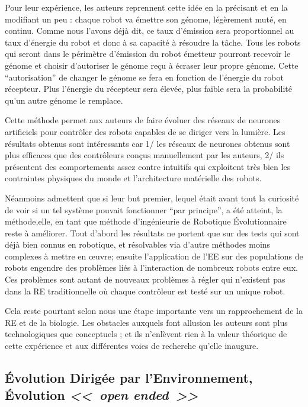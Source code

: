 Pour leur expérience, les auteurs reprennent cette idée en la précisant et en la modifiant un peu : chaque robot va émettre son génome, légèrement muté, en continu. Comme nous l'avons déjà dit,  ce taux d'émission sera proportionnel au taux d'énergie du robot et donc à sa capacité à résoudre la tâche. Tous les robots qui seront dans le périmètre d'émission du robot émetteur pourront recevoir le génome et choisir d'autoriser le génome reçu à écraser leur propre génome. Cette ``autorisation'' de changer le génome se fera en fonction de l'énergie du robot récepteur. Plus l'énergie du récepteur sera élevée, plus faible sera la probabilité qu'un autre génome le remplace.

Cette méthode permet aux auteurs de faire évoluer des réseaux de neurones artificiels pour contrôler des robots capables de se diriger vers la lumière. Les résultats obtenus sont intéressants car 1/ les réseaux de neurones obtenus sont plus efficaces que des contrôleurs conçus manuellement par les auteurs, 2/ ils présentent des comportements assez contre intuitifs qui exploitent très bien les contraintes physiques du monde et l'architecture matérielle des robots.

Néanmoins \cite{watson02embodiedevolutiondistributingevolutionaryalgorithmpopulationrobots} admettent que si leur but premier, lequel était avant tout la curiosité de voir si un tel système pouvait fonctionner ``par principe'', a été atteint, la méthode,elle, en tant que méthode d'ingénieurie de Robotique \'Evolutionnaire reste à améliorer. Tout d'abord les résultats ne portent que sur des tests qui sont déjà bien connus en robotique, et résolvables via d'autre méthodes moins complexes à mettre en {\oe}uvre;  ensuite  l'application de l'EE sur des populations de robots engendre des problèmes liés à l'interaction de nombreux robots entre eux. Ces problèmes sont autant de nouveaux problèmes à régler qui n'existent pas dans la RE traditionnelle où chaque contrôleur est testé sur un unique robot.

Cela reste pourtant selon nous une étape importante vers un rapprochement de la RE et de la biologie. Les obstacles auxquels font allusion les auteurs sont plus technologiques que conceptuels ; et ils n'enlèvent rien à la valeur théorique de cette expérience et aux différentes voies de recherche qu'elle inaugure.

\subsection{\'Evolution Dirigée par l'Environnement, \'Evolution \emph{<<~open ended~>>}}

